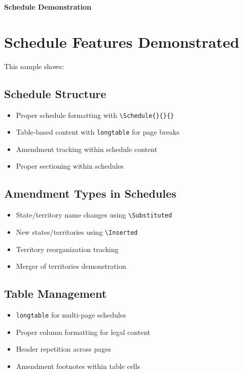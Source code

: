 \documentclass[showamendments]{soi}
\begin{document}
{\centering\Large\bfseries Schedule Demonstration\par}
\vspace{1em}



% 
% 

\clearpage
\section*{Schedule Features Demonstrated}

This sample shows:

\subsection*{Schedule Structure}
\begin{itemize}
\item Proper schedule formatting with \texttt{\textbackslash{}Schedule\{\}\{\}\{\}}
\item Table-based content with \texttt{longtable} for page breaks
\item Amendment tracking within schedule content
\item Proper sectioning within schedules
\end{itemize}

\subsection*{Amendment Types in Schedules}
\begin{itemize}
\item State/territory name changes using \texttt{\textbackslash{}Substituted}
\item New states/territories using \texttt{\textbackslash{}Inserted}
\item Territory reorganization tracking
\item Merger of territories demonstration
\end{itemize}

\subsection*{Table Management}
\begin{itemize}
\item \texttt{longtable} for multi-page schedules
\item Proper column formatting for legal content
\item Header repetition across pages
\item Amendment footnotes within table cells
\end{itemize}
\end{document}
